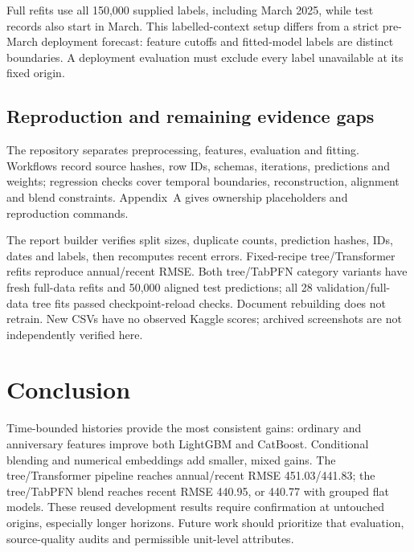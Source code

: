 \documentclass[conference]{IEEEtran}
\begin{document}
Full refits use all 150,000 supplied labels, including March 2025, while test records also start in March. This labelled-context setup differs from a strict pre-March deployment forecast: feature cutoffs and fitted-model labels are distinct boundaries. A deployment evaluation must exclude every label unavailable at its fixed origin.

\balance
\subsection{Reproduction and remaining evidence gaps}
The repository separates preprocessing, features, evaluation and fitting. Workflows record source hashes, row IDs, schemas, iterations, predictions and weights; regression checks cover temporal boundaries, reconstruction, alignment and blend constraints. Appendix~A gives ownership placeholders and reproduction commands.

The report builder verifies split sizes, duplicate counts, prediction hashes, IDs, dates and labels, then recomputes recent errors. Fixed-recipe tree/Transformer refits reproduce annual/recent RMSE. Both tree/TabPFN category variants have fresh full-data refits and 50,000 aligned test predictions; all 28 validation/full-data tree fits passed checkpoint-reload checks. Document rebuilding does not retrain. New CSVs have no observed Kaggle scores; archived screenshots are not independently verified here.

\section{Conclusion}
Time-bounded histories provide the most consistent gains: ordinary and anniversary features improve both LightGBM and CatBoost. Conditional blending and numerical embeddings add smaller, mixed gains. The tree/Transformer pipeline reaches annual/recent RMSE 451.03/441.83; the tree/TabPFN blend reaches recent RMSE 440.95, or 440.77 with grouped flat models. These reused development results require confirmation at untouched origins, especially longer horizons. Future work should prioritize that evaluation, source-quality audits and permissible unit-level attributes.
\end{document}
